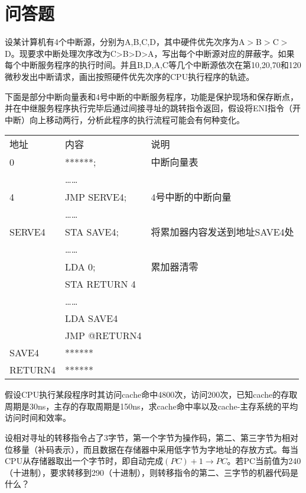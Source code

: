 \documentclass[a4paper]{exam}
\begin{document}
\section{问答题}
\begin{questions}
	\question 设某计算机有4个中断源，分别为A,B,C,D，其中硬件优先次序为A$>$B$>$C$>$D。现要求中断处理次序改为C>B>D>A，写出每个中断源对应的屏蔽字。如果每个中断服务程序的执行时间。并且B,D,A,C等几个中断源依次在第10,20,70和120微秒发出中断请求，画出按照硬件优先次序的CPU执行程序的轨迹。

	\vspace{2cm}
	\question 下面是部分中断向量表和4号中断的中断服务程序，功能是保护现场和保存断点，并在中继服务程序执行完毕后通过间接寻址的跳转指令返回，假设将ENI指令（开中断）向上移动两行，分析此程序的执行流程可能会有何种变化。

	\begin{tabular}{l l l}
	地址&	内容&	说明\\
	0 & ******; & 中断向量表 \\
	 &……& \\
	4&JMP SERVE4;& 4号中断的中断向量 \\
	&……& \\
	SERVE4&STA SAVE4;& 将累加器内容发送到地址SAVE4处\\
	&……& \\
	&LDA 0;& 累加器清零 \\ 
	&STA RETURN 4&\\
	&……& \\
	&LDA SAVE4 & \\
	&JMP @RETURN4 & \\
	SAVE4 &******& \\
	RETURN4 &******& \\
	\end{tabular}

	\vspace{3cm}

	\question 假设CPU执行某段程序时其访问cache命中4800次，访问200次，已知cache的存取周期是30ns，主存的存取周期是150ns，求cache命中率以及cache-主存系统的平均访问时间和效率。

	\vspace{3cm}

	\question 设相对寻址的转移指令占了3字节，第一个字节为操作码，第二、第三字节为相对位移量（补码表示），而且数据在存储器中采用低字节为字地址的存放方式。每当CPU从存储器取出一个字节时，即自动完成$\left( {PC} \right) + 1 \to PC$。若PC当前值为240（十进制），要求转移到290（十进制），则转移指令的第二、三字节的机器代码是什么？
	\vspace{4cm}
\end{questions}
\end{document}
